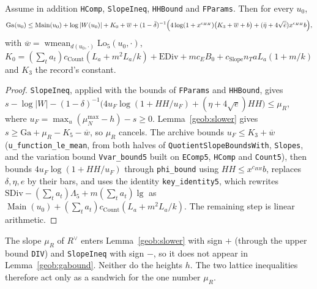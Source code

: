 \begin{lemma}\label{geob:gabound}
Assume in addition \texttt{HComp}, \texttt{SlopeIneq}, \texttt{HHBound} and
\texttt{FParams}. Then for every $u_0$,
\[
\mathrm{Ga}(u_0)\le\operatorname{Main}(u_0)+\log|W(u_0)|+K_0+\overline{w}
+(1-\bar\delta)^{-1}\Bigl(4\log(1+x^{c_{HH}})\bigl(K_3+\overline{w}+b\bigr)+(\bar\eta+4\sqrt{\bar e})x^{c_{HH}}b\Bigr),
\]
with $\overline{w}=\operatorname{wmean}_{d(u_0,\cdot)}\mathrm{Lo}_5(u_0,\cdot)$,
$K_0=(\sum_ta_t)c_{\mathrm{Count}}(L_a+m^2L_a/k)+\mathrm{EDiv}+mc_EB_0+c_{\mathrm{Slope}}n_TaL_a(1+m/k)$
and $K_3$ the record's constant.
\end{lemma}
\begin{proof}
\texttt{SlopeIneq}, applied with the bounds of \texttt{FParams} and
\texttt{HHBound}, gives
$s-\log|W|-(1-\delta)^{-1}\bigl(4u_F\log(1+HH/u_F)+(\eta+4\sqrt e)HH\bigr)\le\mu_R$,
where $u_F=\max_u(\mu_N^{\max}-h)-s\ge0$. Lemma~\ref{geob:slower} gives
$s\ge\mathrm{Ga}+\mu_R-K_5-\overline{w}$, so $\mu_R$ cancels. The archive bounds
$u_F\le K_3+\overline w$ (\texttt{u\_function\_le\_mean}, from both halves of
\texttt{QuotientSlopeBoundsWith}, \texttt{Slopes}, and the variation bound
\texttt{Vvar\_bound5} built on \texttt{EComp5}, \texttt{HComp} and
\texttt{Count5}), then bounds $4u_F\log(1+HH/u_F)$ through \texttt{phi\_bound}
using $HH\le x^{c_{HH}}b$, replaces $\delta,\eta,e$ by their bars, and uses the
identity \texttt{key\_identity5}, which rewrites
$\mathrm{SDiv}-(\sum_ta_t)\Lambda_5+m(\sum_ta_t)\lg$ as
$\operatorname{Main}(u_0)+(\sum_ta_t)c_{\mathrm{Count}}(L_a+m^2L_a/k)$. The
remaining step is linear arithmetic.
\end{proof}

\begin{remark}
The slope $\mu_R$ of $R^{\vee}$ enters Lemma~\ref{geob:slower} with sign $+$
(through the upper bound \texttt{DIV}) and \texttt{SlopeIneq} with sign $-$, so
it does not appear in Lemma~\ref{geob:gabound}. Neither do the heights $h$. The
two lattice inequalities therefore act only as a sandwich for the one number
$\mu_R$.
\end{remark}

